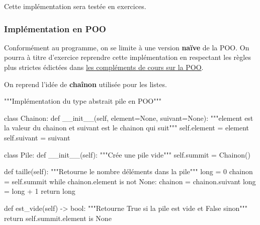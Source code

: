 \documentclass[
  letterpaper,
  DIV=11,
  numbers=noendperiod]{scrartcl}
\newenvironment{Shaded}{\begin{snugshade}}{\end{snugshade}}
\newcommand{\BuiltInTok}[1]{\textcolor[rgb]{0.00,0.23,0.31}{#1}}
\newcommand{\CommentTok}[1]{\textcolor[rgb]{0.37,0.37,0.37}{#1}}
\newcommand{\ControlFlowTok}[1]{\textcolor[rgb]{0.00,0.23,0.31}{#1}}
\newcommand{\DecValTok}[1]{\textcolor[rgb]{0.68,0.00,0.00}{#1}}
\newcommand{\FunctionTok}[1]{\textcolor[rgb]{0.28,0.35,0.67}{#1}}
\newcommand{\KeywordTok}[1]{\textcolor[rgb]{0.00,0.23,0.31}{#1}}
\newcommand{\NormalTok}[1]{\textcolor[rgb]{0.00,0.23,0.31}{#1}}
\newcommand{\OperatorTok}[1]{\textcolor[rgb]{0.37,0.37,0.37}{#1}}
\newcommand{\VariableTok}[1]{\textcolor[rgb]{0.07,0.07,0.07}{#1}}
\begin{document}
Cette implémentation sera testée en exercices.

\hypertarget{impluxe9mentation-en-poo}{%
\subsubsection{Implémentation en POO}\label{impluxe9mentation-en-poo}}

Conformément au programme, on se limite à une version \textbf{naïve} de
la POO. On pourra à titre d'exercice reprendre cette implémentation en
respectant les règles plus strictes édictées dans
\href{../langagesProgr/POO_complements.qmd}{les compléments de cours sur
la POO}.

On reprend l'idée de \textbf{chaînon} utilisée pour les listes.

\begin{Shaded}
\begin{Highlighting}[]
\CommentTok{"""Implémentation du type abstrait pile en POO"""}


\KeywordTok{class}\NormalTok{ Chainon:}
    \KeywordTok{def} \FunctionTok{\_\_init\_\_}\NormalTok{(}\VariableTok{self}\NormalTok{, element}\OperatorTok{=}\VariableTok{None}\NormalTok{, suivant}\OperatorTok{=}\VariableTok{None}\NormalTok{):}
        \CommentTok{"""element est la valeur du chainon et suivant est le chainon qui suit"""}
        \VariableTok{self}\NormalTok{.element }\OperatorTok{=}\NormalTok{ element}
        \VariableTok{self}\NormalTok{.suivant }\OperatorTok{=}\NormalTok{ suivant}


\KeywordTok{class}\NormalTok{ Pile:}
    \KeywordTok{def} \FunctionTok{\_\_init\_\_}\NormalTok{(}\VariableTok{self}\NormalTok{):}
        \CommentTok{"""Crée une pile vide"""}
        \VariableTok{self}\NormalTok{.summit }\OperatorTok{=}\NormalTok{ Chainon()}

    \KeywordTok{def}\NormalTok{ taille(}\VariableTok{self}\NormalTok{):}
        \CommentTok{"""Retourne le nombre d\textquotesingle{}éléments dans la pile"""}
        \BuiltInTok{long} \OperatorTok{=} \DecValTok{0}
\NormalTok{        chainon }\OperatorTok{=} \VariableTok{self}\NormalTok{.summit}
        \ControlFlowTok{while}\NormalTok{ chainon.element }\KeywordTok{is} \KeywordTok{not} \VariableTok{None}\NormalTok{:}
\NormalTok{            chainon }\OperatorTok{=}\NormalTok{ chainon.suivant}
            \BuiltInTok{long} \OperatorTok{=} \BuiltInTok{long} \OperatorTok{+} \DecValTok{1}
        \ControlFlowTok{return} \BuiltInTok{long}

    \KeywordTok{def}\NormalTok{ est\_vide(}\VariableTok{self}\NormalTok{) }\OperatorTok{{-}\textgreater{}} \BuiltInTok{bool}\NormalTok{:}
        \CommentTok{"""Retourne True si la pile est vide et False sinon"""}
        \ControlFlowTok{return} \VariableTok{self}\NormalTok{.summit.element }\KeywordTok{is} \VariableTok{None}


\end{Highlighting}
\end{Shaded}
\end{document}
